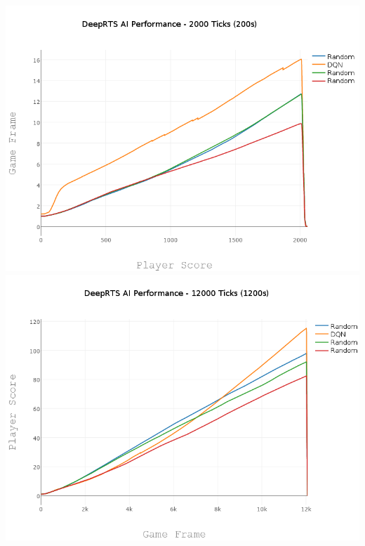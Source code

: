 \documentclass[fleqn,10pt]{article} %
\begin{document}
\includegraphics[width=\linewidth]{3000.png}
\includegraphics[width=\linewidth]{12000.png}
\end{document}
